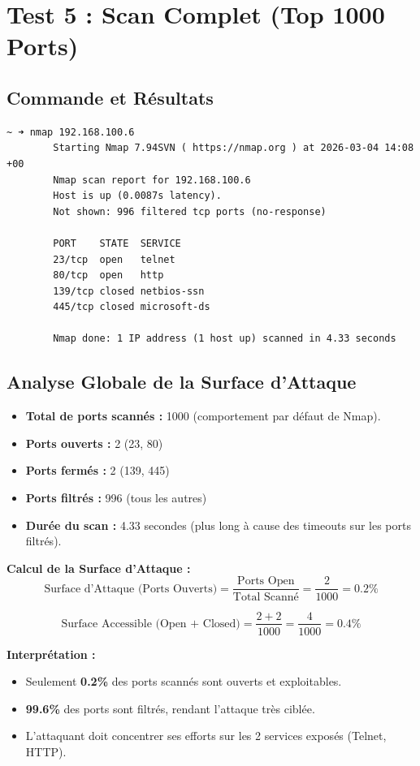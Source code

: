 \documentclass[12pt,a4paper,openany]{report}
\begin{document}
	\section{Test 5 : Scan Complet (Top 1000 Ports)}
	\subsection{Commande et Résultats}
	\begin{lstlisting}[caption=Scan Nmap des 1000 ports les plus courants]
		~ ➜ nmap 192.168.100.6
		Starting Nmap 7.94SVN ( https://nmap.org ) at 2026-03-04 14:08 +00
		Nmap scan report for 192.168.100.6
		Host is up (0.0087s latency).
		Not shown: 996 filtered tcp ports (no-response)
		
		PORT    STATE  SERVICE
		23/tcp  open   telnet
		80/tcp  open   http
		139/tcp closed netbios-ssn
		445/tcp closed microsoft-ds
		
		Nmap done: 1 IP address (1 host up) scanned in 4.33 seconds
	\end{lstlisting}
	
	\subsection{Analyse Globale de la Surface d'Attaque}
	\begin{itemize}
		\item \textbf{Total de ports scannés :} 1000 (comportement par défaut de Nmap).
		\item \textbf{Ports ouverts :} 2 (23, 80)
		\item \textbf{Ports fermés :} 2 (139, 445)
		\item \textbf{Ports filtrés :} 996 (tous les autres)
		\item \textbf{Durée du scan :} 4.33 secondes (plus long à cause des timeouts sur les ports filtrés).
	\end{itemize}
	
	\textbf{Calcul de la Surface d'Attaque :}
	\[
	\text{Surface d'Attaque (Ports Ouverts)} = \frac{\text{Ports Open}}{\text{Total Scanné}} = \frac{2}{1000} = 0.2\%
	\]
	
	\[
	\text{Surface Accessible (Open + Closed)} = \frac{2 + 2}{1000} = \frac{4}{1000} = 0.4\%
	\]
	
	\textbf{Interprétation :}
	\begin{itemize}
		\item Seulement \textbf{0.2\%} des ports scannés sont ouverts et exploitables.
		\item \textbf{99.6\%} des ports sont filtrés, rendant l'attaque très ciblée.
		\item L'attaquant doit concentrer ses efforts sur les 2 services exposés (Telnet, HTTP).
	\end{itemize}
	
\end{document}
